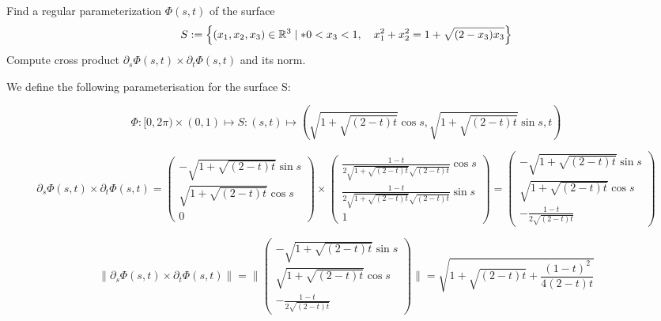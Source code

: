 \documentclass[11pt]{article}
\begin{document}
\begin{exercise}
    Find a regular parameterization $\Phi(s,t)$ of the surface 
    \begin{gather*}
        S := \left\{ (x_1,x_2,x_3) \in \mathbb R^3 \suchthat* 0 < x_3 < 1, \quad x_1^2 + x_2^2 = 1 + \sqrt{ ( 2 - x_3 ) x_3 } \right\}
    \end{gather*}
    Compute cross product $\partial_s \Phi(s,t) \times \partial_t \Phi(s,t)$ and its norm. 
\end{exercise}
\begin{solution}     
We define the following parameterisation for the surface S:

$$
\Phi: [0,2\pi) \times (0,1) \mapsto S: (s,t)\mapsto (\sqrt{1+\sqrt{(2 - t)t}}\cos s, \sqrt{1+\sqrt{(2-t)t}}\sin s,t)
$$

$$\partial_s \Phi(s,t) \times \partial_t \Phi(s,t) = \begin{pmatrix} -\sqrt{1+\sqrt{(2 - t)t}}\sin s \\ \sqrt{1+\sqrt{(2 - t)t}}\cos s\\0 \end{pmatrix} \times \begin{pmatrix} \frac{1 - t}{2\sqrt{1+\sqrt{(2-t)t}}\sqrt{(2-t)t}}\cos s \\ \frac{1 - t}{2\sqrt{1+\sqrt{(2-t)t}}\sqrt{(2-t)t}}\sin s \\1 \end{pmatrix} = \begin{pmatrix} -\sqrt{1+\sqrt{(2 - t)t}}\sin s \\ \sqrt{1+\sqrt{(2 - t)t}}\cos s\\ -\frac{1 - t}{2\sqrt{(2-t)t}} \end{pmatrix} 
$$

$$\|\partial_s \Phi(s,t) \times \partial_t \Phi(s,t)\| = \| \begin{pmatrix} -\sqrt{1+\sqrt{(2 - t)t}}\sin s \\ \sqrt{1+\sqrt{(2 - t)t}}\cos s\\ -\frac{1 - t}{2\sqrt{(2-t)t}} \end{pmatrix} \| = \sqrt{1+\sqrt{(2 - t)t} + \frac{(1 - t)^2}{4(2-t)t}}
$$

\end{solution}
\end{document}
